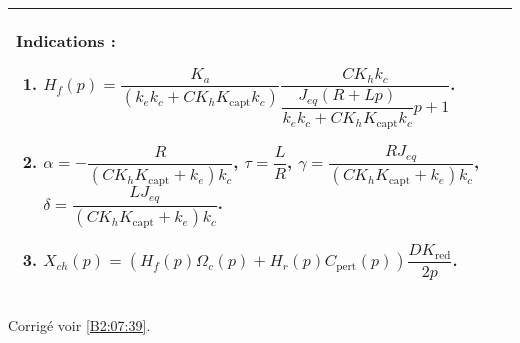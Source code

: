\ifprof
\else
\footnotesize
\noindent \begin{tabular}{|p{.9\linewidth}|}
\hline
Indications : 
\begin{enumerate}
\item $ H_f(p)=
\dfrac{K_a }{\left( k_ek_c+CK_hK_{\text{capt}} k_c\right)} \dfrac{CK_h k_c}{\dfrac{J_{eq}\left(R+Lp\right)}{k_ek_c+CK_hK_{\text{capt}} k_c}p+1} $.
\item  $\alpha = - \dfrac{R}{\left( C K_h K_{\text{capt}}+k_e\right) k_c}$,  $\tau = \dfrac{L}{R}$, 
$\gamma = \dfrac{R J_{eq}}{\left( C K_h K_{\text{capt}}+k_e\right) k_c} $, 
$\delta = \dfrac{LJ_{eq}}{\left( C K_h K_{\text{capt}}+k_e\right) k_c}$.
\item $X_{ch}(p)=\left(H_f(p) \Omega_c(p) + H_r(p) C_{\text{pert}}(p)\right) \dfrac{DK_{\text{red}}}{2p}$.
\end{enumerate}
\\ \hline
\end{tabular}
\normalsize

\begin{flushright}
\footnotesize{Corrigé  voir \ref{B2:07:39}.}
\end{flushright}%
\fi